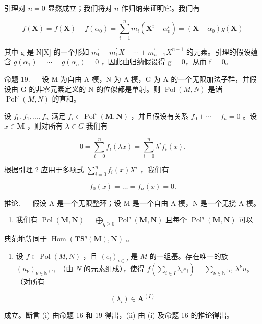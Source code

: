 引理对 \(n = 0\) 显然成立；我们将对 \(n\) 作归纳来证明它。我们有

\[
f (\mathbf {X}) = f (\mathbf {X}) - f \left(\alpha_ {0}\right) = \sum_ {i = 1} ^ {n} m _ {i} \left(\mathbf {X} ^ {i} - \alpha_ {0} ^ {i}\right) = \left(\mathbf {X} - \alpha_ {0}\right) g (\mathbf {X})
\]

其中 g 是 N{[}X{]} 的一个形如 \(m_{0}^{\prime} + m_{1}^{\prime} X + \cdots + m_{n-1}^{\prime} X^{n-1}\) 的元素。引理的假设蕴含 \(g(\alpha_{1}) = \cdots = g(\alpha_{n}) = 0\) ，因此由归纳假设得 g = 0，从而 f = 0。

命题 19. --- 设 M 为自由 A-模，N 为 A-模，G 为 A 的一个无限加法子群，并假设由 G 的非零元素定义的 N 的位似都是单射。则 \(\operatorname{Pol}(M,N)\) 是诸 \(\operatorname{Pol}^{q}(M,N)\) 的直和。

设 \(f_{0}, f_{1}, \ldots, f_{n}\) 满足 \(f_{i} \in \operatorname{Pol}^{i}(\mathbf{M}, \mathbf{N})\) ，并且假设有关系 \(f_{0} + \cdots + f_{n} = 0\) 。设 \(x \in \mathbf{M}\) ，则对所有 \(\lambda \in G\) 我们有

\[
0 = \sum_ {i = 0} ^ {n} f _ {i} (\lambda x) = \sum_ {i = 0} ^ {n} \lambda^ {i} f _ {i} (x).
\]

根据引理 2 应用于多项式 \(\sum_{i=0}^{n} f_i(x) X^i\) ，我们有

\[
f _ {0} (x) = \dots = f _ {n} (x) = 0.
\]

推论. --- 假设 A 是一个无限整环；设 M 是一个自由 A-模，N 是一个无挠 A-模。

\begin{enumerate}
\def\labelenumi{(\roman{enumi})}
\tightlist
\item
  我们有 \(\operatorname{Pol}(\mathbf{M},\mathbf{N}) = \bigoplus_{q\geqslant 0}\operatorname{Pol}^q (\mathbf{M},\mathbf{N})\) 且每个 \(\operatorname{Pol}^q (\mathbf{M},\mathbf{N})\) 可以
\end{enumerate}

典范地等同于 \(\operatorname{Hom}(\mathbf{TS}^q(\mathbf{M}),\mathbf{N})\) 。

\begin{enumerate}
\def\labelenumi{(\roman{enumi})}
\setcounter{enumi}{1}
\tightlist
\item
  设 \(f \in \operatorname{Pol}(M, N)\) ，且 \((e_i)_{i \in I}\) 是 \(M\) 的一组基。存在唯一的族 \((u_\nu)_{\nu \in \mathbb{N}^{(I)}}\) （由 \(N\) 的元素组成），使得 \(f\left(\sum_{i \in I} \lambda_i e_i\right) = \sum_{\nu \in \mathbb{N}^{(I)}} \lambda^\nu u_\nu\) （对所有
\end{enumerate}

\[
\left(\lambda_ {i}\right) \in \mathbf {A} ^ {(I)}
\]

成立。断言 (i) 由命题 16 和 19 得出，(ii) 由 (i) 及命题 16 的推论得出。
